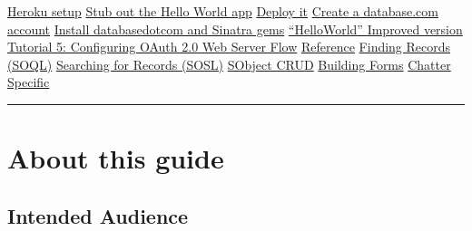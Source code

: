 \documentclass{article}
\begin{document}
\noindent\hyperlink{heroku_setup}{Heroku setup}\dotfill \pageref*{heroku_setup} \linebreak
\noindent\hyperlink{stub_out_the_hello_world_app}{Stub out the Hello World app}\dotfill \pageref*{stub_out_the_hello_world_app} \linebreak
\noindent\hyperlink{deploy_it}{Deploy it}\dotfill \pageref*{deploy_it} \linebreak
\noindent\hyperlink{create_a_databasecom_account}{Create a database.com account}\dotfill \pageref*{create_a_databasecom_account} \linebreak
\noindent\hyperlink{install_databasedotcom_and_sinatra_gems}{Install databasedotcom and Sinatra gems}\dotfill \pageref*{install_databasedotcom_and_sinatra_gems} \linebreak
\noindent\hyperlink{helloworld_improved_version}{``{}HelloWorld''{} Improved version}\dotfill \pageref*{helloworld_improved_version} \linebreak
\noindent\hyperlink{tutorial_5_configuring_oauth_20_web_server_flow}{Tutorial 5: Configuring OAuth 2.0 Web Server Flow}\dotfill \pageref*{tutorial_5_configuring_oauth_20_web_server_flow} \linebreak
\noindent\hyperlink{reference}{Reference}\dotfill \pageref*{reference} \linebreak
\noindent\hyperlink{finding_records_soql}{Finding Records (SOQL)}\dotfill \pageref*{finding_records_soql} \linebreak
\noindent\hyperlink{searching_for_records_sosl}{Searching for Records (SOSL)}\dotfill \pageref*{searching_for_records_sosl} \linebreak
\noindent\hyperlink{sobject_crud}{SObject CRUD}\dotfill \pageref*{sobject_crud} \linebreak
\noindent\hyperlink{building_forms}{Building Forms}\dotfill \pageref*{building_forms} \linebreak
\noindent\hyperlink{chatter_specific}{Chatter Specific}\dotfill \pageref*{chatter_specific} \linebreak



\vspace{.5em} \hrule \vspace{.5em}
\hypertarget{about_this_guide}{}\section*{{About this guide}}\label{about_this_guide}

\hypertarget{intended_audience}{}\subsection*{{Intended Audience}}\label{intended_audience}
\end{document}
